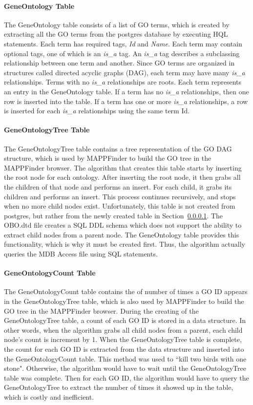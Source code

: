 \paragraph{GeneOntology Table}
\label{gotable}
The GeneOntology table consists of a list of GO terms, which is created by extracting all the
GO terms from the postgres database by executing HQL statements. Each term has required tags, \emph{Id} and \emph{Name}.
Each term may contain optional tags, one of which is an \emph{is\_a} tag. An \emph{is\_a} tag describes a
subclassing relationship between one term and another. Since GO terms
are organized in structures called directed acyclic graphs (DAG), each term may have many \emph{is\_a} relationships.
Terms with no \emph{is\_a} relationships are roots. Each term represents an entry in the GeneOntology table. If a term
has no \emph{is\_a} relationships, then one row is inserted into the table. If a term has one or more
\emph{is\_a} relationships, a row is inserted for each \emph{is\_a} relationships using the same term Id.


\paragraph{GeneOntologyTree Table}
The GeneOntologyTree table contains a tree representation of the GO DAG structure, which is used by MAPPFinder
to build the GO tree in the MAPPFinder browser. The algorithm that creates this table starts by inserting the root
node for each ontology. After inserting the root node, it then grabs all the children of that node and performs an insert.
For each child, it grabs its children
and performs an insert. This process continues recursively, and stops when no more child nodes exist.
Unfortunately, this table is not created from postgres, but rather from the
newly created table in Section~\ref{gotable}. The OBO.dtd file creates a SQL DDL schema which does not support
the ability to extract child nodes from a parent node. The GeneOntology table provides this functionality, which
is why it must be created first. Thus, the algorithm actually queries the MDB Access file using SQL statements.


\paragraph{GeneOntologyCount Table}
The GeneOntologyCount table contains the of number of times a GO ID appears in the GeneOntologyTree table, which
is also used by MAPPFinder to build the GO tree in the MAPPFinder browser. During the creating of the GeneOntologyTree
table, a count of each GO ID is stored in a data structure. In other words, when the algorithm grabs all child nodes from
a parent, each child node's count is increment by 1. When the GeneOntologyTree table is complete, the count for
each GO ID is extracted from the data structure and inserted into the GeneOntologyCount table.
This method was used to ``kill two birds with one stone". Otherwise,
the algorithm would have to wait until the GeneOntologyTree table was complete. Then for each GO ID, the algorithm would have
to query the GeneOntologyTree to extract the number of times it showed up in the table, which is costly and inefficient.


